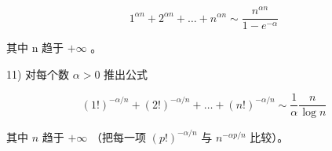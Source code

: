 \[
1 ^ {\alpha n} + 2 ^ {\alpha n} + \dots + n ^ {\alpha n} \sim \frac {n ^ {\alpha n}}{1 - e ^ {- \alpha}}
\]

其中 n 趋于 \(+\infty\) 。

11) 对每个数 \(\alpha > 0\) 推出公式

\[
(1!) ^ {- \alpha / n} + (2!) ^ {- \alpha / n} + \dots + (n!) ^ {- \alpha / n} \sim \frac {1}{\alpha} \frac {n}{\log n}
\]

其中 \(n\) 趋于 \(+\infty\) （把每一项 \((p!)^{-\alpha / n}\) 与 \(n^{-\alpha p / n}\) 比较）。

